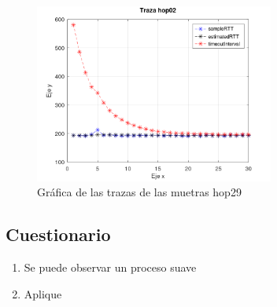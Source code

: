 \begin{figure}[H]
	\centering
	\includegraphics[width=0.7\textwidth]{img/trazaHop29.png}
	\caption{Gr\'afica de las trazas de las muetras hop29}
	\label{fig:hop29Graph}
\end{figure}

\subsection*{Cuestionario}

\begin{enumerate}
    \item Se puede observar un proceso suave
    \item Aplique 
\end{enumerate}
